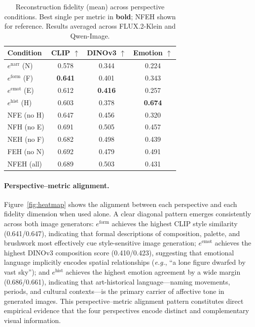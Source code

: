 \begin{table}[h]
\centering
\caption{Reconstruction fidelity (mean) across perspective conditions. Best single per metric in \textbf{bold}; NFEH shown for reference. Results averaged across FLUX.2-Klein and Qwen-Image.}
\label{tab:complementarity}
\setlength{\tabcolsep}{5pt}
\begin{tabular}{lccc}
\toprule
\textbf{Condition} & \textbf{CLIP} $\uparrow$ & \textbf{DINOv3} $\uparrow$ & \textbf{Emotion} $\uparrow$ \\
\midrule
$e^{\text{narr}}$ (N)  & 0.578 & 0.344 & 0.224 \\
$e^{\text{form}}$ (F)  & \textbf{0.641} & 0.401 & 0.343 \\
$e^{\text{emot}}$ (E)  & 0.612 & \textbf{0.416} & 0.257 \\
$e^{\text{hist}}$ (H)  & 0.603 & 0.378 & \textbf{0.674} \\
\midrule
NFE (no H) & 0.647 & 0.456 & 0.320 \\
NFH (no E) & 0.691 & 0.505 & 0.457 \\
NEH (no F) & 0.682 & 0.498 & 0.439 \\
FEH (no N) & 0.692 & 0.479 & 0.491 \\
\midrule
NFEH (all) & 0.689 & 0.503 & 0.431 \\
\bottomrule
\end{tabular}
\end{table}

\paragraph{Perspective--metric alignment.}
Figure~\ref{fig:heatmap} shows the alignment between each perspective and each fidelity dimension when used alone.
A clear diagonal pattern emerges consistently across both image generators: $e^{\text{form}}$ achieves the highest CLIP style similarity (0.641/0.647), indicating that formal descriptions of composition, palette, and brushwork most effectively cue style-sensitive image generation; $e^{\text{emot}}$ achieves the highest DINOv3 composition score (0.410/0.423), suggesting that emotional language implicitly encodes spatial relationships (\emph{e.g.}, ``a lone figure dwarfed by vast sky''); and $e^{\text{hist}}$ achieves the highest emotion agreement by a wide margin (0.686/0.661), indicating that art-historical language---naming movements, periods, and cultural contexts---is the primary carrier of affective tone in generated images.
This perspective--metric alignment pattern constitutes direct empirical evidence that the four perspectives encode distinct and complementary visual information.

